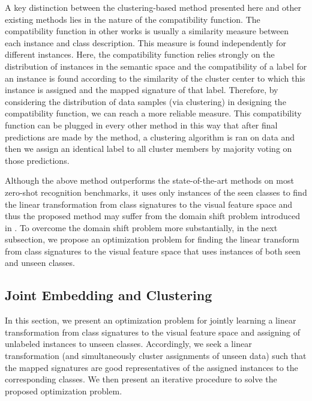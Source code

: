 \documentclass[10pt,twocolumn,letterpaper]{article}
\begin{document}
A key distinction between the clustering-based method presented here and other existing methods lies in the nature of the compatibility function.
 The compatibility function in other works is usually a similarity measure between each instance and class description. This measure is found independently for different instances.
 Here, the compatibility function relies strongly on the distribution of instances in the semantic space and the compatibility of a label for an instance is found
according to the similarity of the cluster center to which this instance is assigned and the mapped signature of that label.
Therefore, by considering the distribution of data samples (via clustering)
in designing the compatibility function, we can reach a more reliable measure.
This compatibility function can be plugged in every other method in this way that after final predictions are made by the method,
a clustering algorithm is ran on data and then we assign an identical label to all cluster
members by majority voting on those predictions.

Although the above method outperforms the state-of-the-art methods on most zero-shot recognition benchmarks, it uses only instances of the seen classes to find the linear transformation from class signatures to the visual feature space and thus the proposed method may suffer from the domain shift problem introduced in \cite{eccv14}.
To overcome the domain shift problem more substantially, in the next subsection, we propose an optimization problem for finding the linear transform from class signatures to the visual feature space that uses instances of both seen and unseen classes.

\subsection{Joint Embedding and Clustering}
\label{joint}
In this section,
 we present an optimization problem for jointly learning a linear transformation
from class signatures to the visual feature space and assigning of unlabeled instances to unseen classes.
Accordingly, we seek a linear transformation (and simultaneously cluster assignments of unseen data)
such that the mapped signatures are good representatives of the assigned instances to the corresponding classes.
 We then present an iterative procedure to solve the proposed optimization problem.
\end{document}
